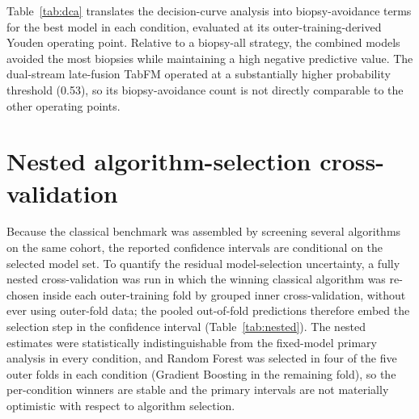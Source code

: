 \documentclass[11pt]{article}
\begin{document}
Table~\ref{tab:dca} translates the decision-curve analysis into biopsy-avoidance
terms for the best model in each condition, evaluated at its outer-training-derived
Youden operating point. Relative to a biopsy-all strategy, the combined models
avoided the most biopsies while maintaining a high negative predictive value. The
dual-stream late-fusion TabFM operated at a substantially higher probability
threshold (0.53), so its biopsy-avoidance count is not directly comparable to the
other operating points.

\begin{table}[htbp]
\centering
\caption{Biopsy-avoidance summary at the selected Youden operating point for the
best model in each condition. Net benefit and biopsies avoided per 100 patients are
relative to a biopsy-all strategy at the same threshold.}
\label{tab:dca}
\end{table}

\section{Nested algorithm-selection cross-validation}
\label{app:nested}

Because the classical benchmark was assembled by screening several algorithms on the
same cohort, the reported confidence intervals are conditional on the selected model
set. To quantify the residual model-selection uncertainty, a fully nested
cross-validation was run in which the winning classical algorithm was re-chosen inside
each outer-training fold by grouped inner cross-validation, without ever using
outer-fold data; the pooled out-of-fold predictions therefore embed the selection step
in the confidence interval (Table~\ref{tab:nested}). The nested estimates were
statistically indistinguishable from the fixed-model primary analysis in every
condition, and Random Forest was selected in four of the five outer folds in each
condition (Gradient Boosting in the remaining fold), so the per-condition winners are
stable and the primary intervals are not materially optimistic with respect to
algorithm selection.
\end{document}
